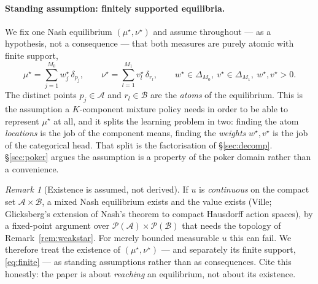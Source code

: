 \documentclass[11pt]{article}
\theoremstyle{definition}
\theoremstyle{remark}
\newtheorem{remark}{Remark}
\newcommand{\cA}{\mathcal{A}}
\newcommand{\cB}{\mathcal{B}}
\newcommand{\cP}{\mathcal{P}}
\begin{document}
\paragraph{Standing assumption: finitely supported equilibria.}
We fix one Nash equilibrium $(\mu^\star,\nu^\star)$ and assume throughout --- as
a hypothesis, not a consequence --- that both measures are purely atomic with
finite support,
\begin{equation}\label{eq:finite}
  \mu^\star = \sum_{j=1}^{M_0} w^\star_j\,\delta_{p_j},
  \qquad
  \nu^\star = \sum_{l=1}^{M_1} v^\star_l\,\delta_{r_l},
  \qquad
  w^\star \in \Delta_{M_0},\ v^\star \in \Delta_{M_1},\ w^\star,v^\star > 0 .
\end{equation}
The distinct points $p_j \in \cA$ and $r_l \in \cB$ are the \emph{atoms} of the
equilibrium. This is the assumption a $K$-component mixture policy needs in order
to be able to represent $\mu^\star$ at all, and it splits the learning problem in
two: finding the atom \emph{locations} is the job of the component means, finding
the \emph{weights} $w^\star, v^\star$ is the job of the categorical head. That
split is the factorisation of \S\ref{sec:decomp}. \S\ref{sec:poker} argues the
assumption is a property of the poker domain rather than a convenience.

\begin{remark}[Existence is assumed, not derived]\label{rem:exist}
If $u$ is \emph{continuous} on the compact set $\cA \times \cB$, a mixed Nash
equilibrium exists and the value exists (Ville; Glicksberg's extension of Nash's
theorem to compact Hausdorff action spaces), by a fixed-point argument over
$\cP(\cA) \times \cP(\cB)$ that needs the topology of
Remark~\ref{rem:weakstar}. For merely bounded measurable $u$ this can fail. We
therefore treat the existence of $(\mu^\star,\nu^\star)$ --- and separately its
finite support, \eqref{eq:finite} --- as standing assumptions rather than as
consequences. Cite this honestly: the paper is about \emph{reaching} an
equilibrium, not about its existence.
\end{remark}
\end{document}
